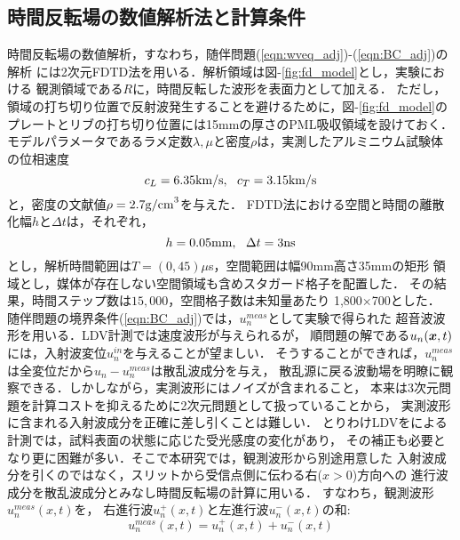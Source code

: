 \subsection{時間反転場の数値解析法と計算条件}
時間反転場の数値解析，すなわち，随伴問題(\ref{eqn:wveq_adj})-(\ref{eqn:BC_adj})の解析
には2次元FDTD法を用いる．解析領域は図-\ref{fig:fd_model}とし，実験における
観測領域である$R$に，時間反転した波形を表面力として加える．
ただし，領域の打ち切り位置で反射波発生することを避けるために，図-\ref{fig:fd_model}の
プレートとリブの打ち切り位置には15mmの厚さのPML吸収領域を設けておく．
モデルパラメータであるラメ定数$\lambda, \mu$と密度$\rho$は，実測したアルミニウム試験体
の位相速度
\begin{equation}
	c_L=6.35{\rm km/s}, \ \ c_T=3.15{\rm km/s}
	\label{eqn:phase_vels}
\end{equation}
と，密度の文献値$\rho=2.7{\rm g/cm}^3$を与えた．
FDTD法における空間と時間の離散化幅$h$と$\Delta t$は，それぞれ，
\begin{equation}
	h=0.05{\rm mm}, \ \ \Delta t=3{\rm ns}
	\label{eqn:}
\end{equation}
とし，解析時間範囲は$T=(0,45)\mu$s，空間範囲は幅90mm高さ35mmの矩形
領域とし，媒体が存在しない空間領域も含めスタガード格子を配置した．
その結果，時間ステップ数は$15,000$，空間格子数は未知量あたり
1,800$\times$700とした．\\
\hspace{\parindent}
随伴問題の境界条件(\ref{eqn:BC_adj})では，$u_n^{meas}$として実験で得られた
超音波波形を用いる．LDV計測では速度波形が与えられるが，
順問題の解である$u_n(\boldsymbol{x},t)$には，入射波変位$u_n^{in}$を与えることが望ましい．
そうすることができれば，$u_n^{meas}$は全変位だから$u_n-u_n^{meas}$は散乱波成分を与え，
散乱源に戻る波動場を明瞭に観察できる．しかしながら，実測波形にはノイズが含まれること，
本来は3次元問題を計算コストを抑えるために2次元問題として扱っていることから，
実測波形に含まれる入射波成分を正確に差し引くことは難しい．
とりわけLDVをによる計測では，試料表面の状態に応じた受光感度の変化があり，
その補正も必要となり更に困難が多い．そこで本研究では，観測波形から別途用意した
入射波成分を引くのではなく，スリットから受信点側に伝わる右($x>0$)方向への
進行波成分を散乱波成分とみなし時間反転場の計算に用いる．
すなわち，観測波形$u_n^{meas}(x,t)$を，
右進行波$u_n^{+}(x,t)$と左進行波$u_n^{-}(x,t)$の和:
\begin{equation}
	u_n^{meas}(x,t)=u_n^{+}(x,t)+u_n^{-}(x,t)
	\label{eqn:split}
\end{equation}
